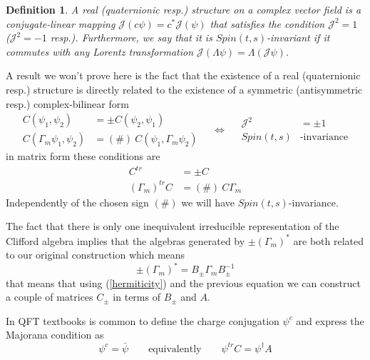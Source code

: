 \documentclass[a4paper,12pt]{article}
\newtheorem{df}{Definition}
\numberwithin{equation}{section}
\numberwithin{thm}{section}
\numberwithin{exm}{section}
\newcommand{\<}{{\langle}}
\renewcommand{\>}{{\rangle}}
\newcommand{\G}{{\Gamma}}
\renewcommand{\L}{{\Lambda}}
\begin{document}
	\begin{df}
	A real (quaternionic resp.) structure on a complex vector field is a conjugate-linear mapping ${\mathcal J}(c\psi) = c^* {\mathcal J}(\psi)$ that satisfies the condition ${\mathcal J}^2 = 1$ (${\mathcal J}^2 = -1$ resp.). Furthermore, we say that it is $Spin(t,s)$-invariant if it commutes with any Lorentz transformation ${\mathcal J}(\L \psi) = \L ({\mathcal J}\psi)$.
	\end{df}
A result we won't prove here is the fact that the existence of a real (quaternionic resp.) structure is directly related to the existence of a symmetric (antisymmetric resp.) complex-bilinear form
	\begin{equation}
		\begin{aligned}
		C(\psi_1,\psi_2) & = \pm C(\psi_2,\psi_1) \\
		C(\G_m \psi_1, \psi_2) & = (\#)\ C(\psi_1, \G_m\psi_2)
		\end{aligned}
	\quad \Leftrightarrow \quad
		\begin{aligned}
		{\mathcal J}^2 & = \pm 1 \\
		Spin(t,s)&\text{-invariance}
		\end{aligned}
	\end{equation}
in matrix form these conditions are
	\begin{equation}
		\begin{aligned}
		C^{tr} & = \pm C \\
		(\G_m)^{tr} C & = (\#)\ C \G_m
		\end{aligned}
	\end{equation}
Independently of the chosen sign $(\#)$ we will have $Spin(t,s)$-invariance.

The fact that there is only one inequivalent irreducible representation of the Clifford algebra implies that the algebras generated by $\pm(\G_m)^*$ are both related to our original construction which means
	\begin{equation}
	\pm(\G_m)^* = B_{\pm} \G_m B_{\pm}^{-1}
	\end{equation}
that means that using (\ref{hermiticity}) and the previous equation we can construct a couple of matrices $C_{\pm}$ in terms of $B_{\pm}$ and $A$.

In QFT textbooks is common to define the charge conjugation $\psi^c$  and express the Majorana condition as
	\begin{equation}
	\psi^c = \bar\psi\qquad\text{equivalently}\qquad\psi^{tr} C = \psi^\dagger A
	\end{equation}
\end{document}
